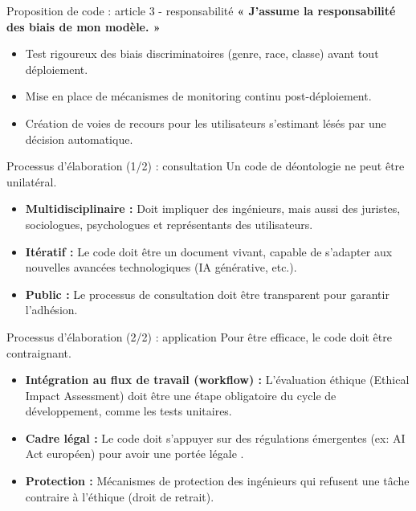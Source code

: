 \documentclass[9pt, aspectratio=169]{beamer}
\begin{document}
\begin{frame}{Proposition de code : article 3 - responsabilité}
    \textbf{« J'assume la responsabilité des biais de mon modèle. »}
    \vspace{0.5cm}
    \begin{itemize}
        \item Test rigoureux des biais discriminatoires (genre, race, classe) avant tout déploiement.
        \item Mise en place de mécanismes de monitoring continu post-déploiement.
        \item Création de voies de recours pour les utilisateurs s'estimant lésés par une décision automatique.
    \end{itemize}
\end{frame}

\begin{frame}{Processus d'élaboration (1/2) : consultation}
    Un code de déontologie ne peut être unilatéral.
    \begin{itemize}
        \item \textbf{Multidisciplinaire :} Doit impliquer des ingénieurs, mais aussi des juristes, sociologues, psychologues et représentants des utilisateurs.
        \item \textbf{Itératif :} Le code doit être un document vivant, capable de s'adapter aux nouvelles avancées technologiques (IA générative, etc.).
        \item \textbf{Public :} Le processus de consultation doit être transparent pour garantir l'adhésion.
    \end{itemize}
\end{frame}

\begin{frame}{Processus d'élaboration (2/2) : application}
    Pour être efficace, le code doit être contraignant.
    \begin{itemize}
        \item \textbf{Intégration au flux de travail (workflow) :} L'évaluation éthique (Ethical Impact Assessment) doit être une étape obligatoire du cycle de développement, comme les tests unitaires.
        \item \textbf{Cadre légal :} Le code doit s'appuyer sur des régulations émergentes (ex: AI Act européen) pour avoir une portée légale \parencite{Neuer2024Le}.
        \item \textbf{Protection :} Mécanismes de protection des ingénieurs qui refusent une tâche contraire à l'éthique (droit de retrait).
    \end{itemize}
\end{frame}
\end{document}
